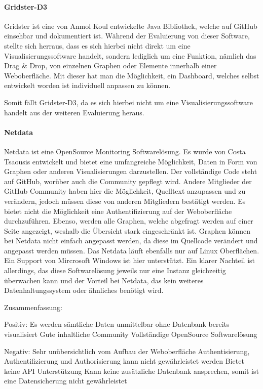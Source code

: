 \paragraph{Gridster-D3}
\label{paragraph:gridster-d3}
Gridster ist eine von Anmol Koul entwickelte Java Bibliothek, welche
auf \gls{GitHub} einsehbar und dokumentiert ist. Während der Evaluierung von
dieser Software, stellte sich herraus, dass es sich hierbei nicht direkt um eine
Visualisierungssoftware handelt, sondern lediglich um eine Funktion, nämlich das
Drag \& Drop, von einzelnen Graphen oder Elemente innerhalb einer Weboberfläche.
Mit dieser hat man die Möglichkeit, ein Dashboard, welches selbst entwickelt
worden ist individuell anpassen zu können.

Somit fällt Gridster-D3, da es sich hierbei nicht um eine
Visualisierungssoftware handelt aus der weiteren Evaluierung heraus.

\paragraph{Netdata}
\label{paragraph:netdata}
Netdata ist eine OpenSource Monitoring Softwarelösung. Es wurde von Costa
Tsaousis entwickelt und bietet eine umfangreiche Möglichkeit, Daten in Form von
Graphen oder anderen Visualisierungen darzustellen. Der vollständige Code steht
auf GitHub, worüber auch die Community gepflegt wird. Andere Mitglieder der
GitHub Community haben hier die Möglichkeit, Quelltext anzupassen und zu
verändern, jedoch müssen diese von anderen Mitgliedern bestätigt werden. Es
bietet nicht die Möglichkeit eine Authentifizierung auf der Weboberfläche
durchzuführen. Ebenso, werden alle Graphen, welche abgefragt werden auf einer
Seite angezeigt, weshalb die Übersicht stark eingeschränkt ist. Graphen können
bei Netdata nicht einfach angepasst werden, da diese im Quellcode verändert und
angepasst werden müssen. Das Netdata läuft ebenfalls nur auf Linux Oberflächen.
Ein Support von Mircrosoft Windows ist hier unterstützt. Ein klarer Nachteil
ist allerdings, das diese Softwarelösung jeweils nur eine Instanz gleichzeitig
überwachen kann und der Vorteil bei Netdata, das kein weiteres
Datenhaltungssystem oder ähnliches benötigt wird.

Zusammenfassung:

\begin{outline}
  Positiv:
  \1 Es werden sämtliche Daten unmittelbar ohne Datenbank bereits visualisiert
  \1 Gute inhaltliche Community
  \1 Vollständige OpenSource Softwarelösung

  Negativ:
  \1 Sehr unübersichtlich vom Aufbau der Weboberfläche
  \1 Authentisierung, Authentifizierung und Authorisierung kann nicht
  gewährleistet werden
  \1 Bietet keine API Unterstützung
  \1 Kann keine zusätzliche Datenbank ansprechen, somit ist eine Datensicherung
  nicht gewährleistet
\end{outline}

